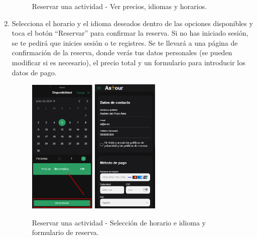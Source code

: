 \begin{enumerate}
\begin{figure}[H]
		      \caption{Reservar una actividad - Ver precios, idiomas y horarios.}
	      \end{figure}
	\item Selecciona el horario y el idioma deseados dentro de las opciones disponibles y toca el botón “Reservar” para confirmar la reserva.
	      Si no has iniciado sesión, se te pedirá que inicies sesión o te registres.
	      Se te llevará a una página de confirmación de la reserva, donde verás tus datos personales (se pueden modificar si es necesario), el precio total y un formulario para introducir los datos de pago.
	      \begin{figure}[H]
		      \centering
		      \includegraphics[width=0.3\textwidth]{7-Construccion/Manuales/mobile/horario seleccionado.png}
		      \includegraphics[width=0.3\textwidth]{7-Construccion/Manuales/mobile/formulario reserva.png}
		      \caption{Reservar una actividad - Selección de horario e idioma y formulario de reserva.}
	      \end{figure}

\end{enumerate}
